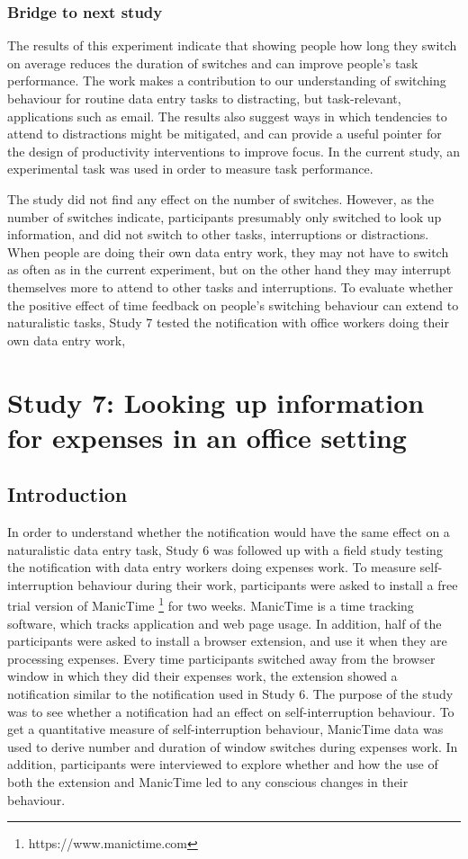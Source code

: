 \subsubsection{Bridge to next study}
The results of this experiment indicate that showing people how long they switch on average reduces the duration of switches and can improve people's task performance. The work makes a contribution to our understanding of switching behaviour for routine data entry tasks to distracting, but task-relevant, applications such as email. The results also suggest ways in which tendencies to attend to distractions might be mitigated, and can provide a useful pointer for the design of productivity interventions to improve focus. In the current study, an experimental task was used in order to measure task performance. 

The study did not find any effect on the number of switches. However, as the number of switches indicate, participants presumably only switched to look up information, and did not switch to other tasks, interruptions or distractions. When people are doing their own data entry work, they may not have to switch as often as in the current experiment, but on the other hand they may interrupt themselves more to attend to other tasks and interruptions. To evaluate whether the positive effect of time feedback on people's switching behaviour can extend to naturalistic tasks, Study 7 tested the notification with office workers doing their own data entry work,

\section{Study 7: Looking up information for expenses in an office setting}
\subsection{Introduction}
In order to understand whether the notification would have the same effect on a naturalistic data entry task, Study 6 was followed up with a field study testing the notification with data entry workers doing expenses work. To measure self-interruption behaviour during their work, participants were asked to install a free trial version of ManicTime \footnote{https://www.manictime.com} for two weeks. ManicTime is a time tracking software, which tracks application and web page usage. In addition, half of the participants were asked to install a browser extension, and use it when they are processing expenses. Every time participants switched away from the browser window in which they did their expenses work, the extension showed a notification similar to the notification used in Study 6. The purpose of the study was to see whether a notification had an effect on self-interruption behaviour. To get a quantitative measure of self-interruption behaviour, ManicTime data was used to derive number and duration of window switches during expenses work. In addition, participants were interviewed to explore whether and how the use of both the extension and ManicTime led to any conscious changes in their behaviour.
 
